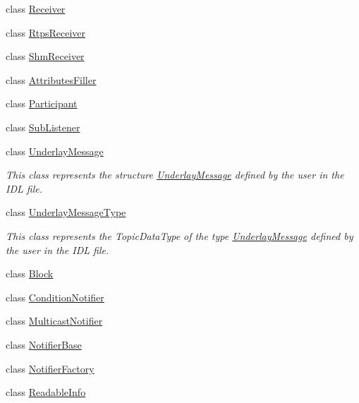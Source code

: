 \begin{DoxyCompactItemize}
\item 
class \hyperlink{classapollo_1_1cyber_1_1transport_1_1Receiver}{Receiver}
\item 
class \hyperlink{classapollo_1_1cyber_1_1transport_1_1RtpsReceiver}{Rtps\-Receiver}
\item 
class \hyperlink{classapollo_1_1cyber_1_1transport_1_1ShmReceiver}{Shm\-Receiver}
\item 
class \hyperlink{classapollo_1_1cyber_1_1transport_1_1AttributesFiller}{Attributes\-Filler}
\item 
class \hyperlink{classapollo_1_1cyber_1_1transport_1_1Participant}{Participant}
\item 
class \hyperlink{classapollo_1_1cyber_1_1transport_1_1SubListener}{Sub\-Listener}
\item 
class \hyperlink{classapollo_1_1cyber_1_1transport_1_1UnderlayMessage}{Underlay\-Message}
\begin{DoxyCompactList}\small\item\em This class represents the structure \hyperlink{classapollo_1_1cyber_1_1transport_1_1UnderlayMessage}{Underlay\-Message} defined by the user in the I\-D\-L file. \end{DoxyCompactList}\item 
class \hyperlink{classapollo_1_1cyber_1_1transport_1_1UnderlayMessageType}{Underlay\-Message\-Type}
\begin{DoxyCompactList}\small\item\em This class represents the Topic\-Data\-Type of the type \hyperlink{classapollo_1_1cyber_1_1transport_1_1UnderlayMessage}{Underlay\-Message} defined by the user in the I\-D\-L file. \end{DoxyCompactList}\item 
class \hyperlink{classapollo_1_1cyber_1_1transport_1_1Block}{Block}
\item 
class \hyperlink{classapollo_1_1cyber_1_1transport_1_1ConditionNotifier}{Condition\-Notifier}
\item 
class \hyperlink{classapollo_1_1cyber_1_1transport_1_1MulticastNotifier}{Multicast\-Notifier}
\item 
class \hyperlink{classapollo_1_1cyber_1_1transport_1_1NotifierBase}{Notifier\-Base}
\item 
class \hyperlink{classapollo_1_1cyber_1_1transport_1_1NotifierFactory}{Notifier\-Factory}
\item 
class \hyperlink{classapollo_1_1cyber_1_1transport_1_1ReadableInfo}{Readable\-Info}
\item 

\end{DoxyCompactItemize}
